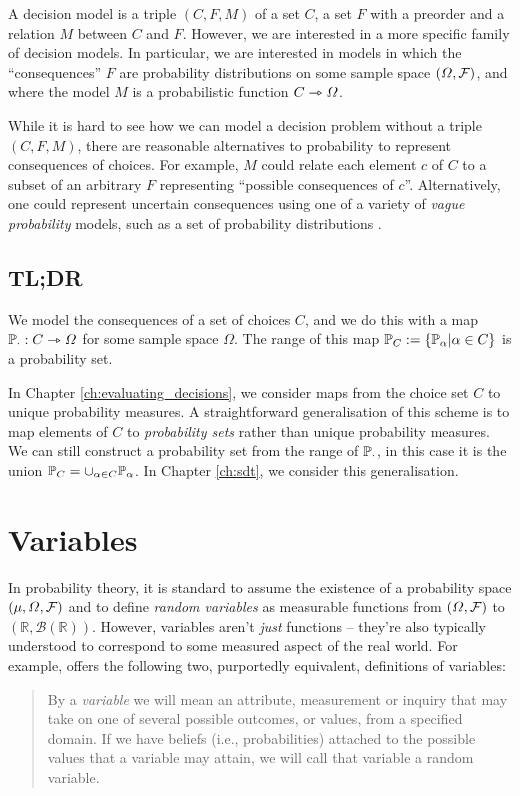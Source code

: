 A decision model is a triple $(C,F,M)$ of a set $C$, a set $F$ with a preorder and a relation $M$ between $C$ and $F$.  However, we are interested in a more specific family of decision models. In particular, we are interested in models in which the ``consequences'' $F$ are probability distributions on some sample space $(\Omega,\mathcal{F})$, and where the model $M$ is a probabilistic function $C\rightarrowtriangle \Omega$.

While it is hard to see how we can model a decision problem without a triple $(C,F,M)$, there are reasonable alternatives to probability to represent consequences of choices. For example, $M$ could relate each element $c$ of $C$ to a subset of an arbitrary $F$ representing ``possible consequences of $c$''. Alternatively, one could represent uncertain consequences using one of a variety of \emph{vague probability} models, such as a set of probability distributions \citep{walley_statistical_1991}. 

\subsection{TL;DR}\label{sec:probability_sets}

We model the consequences of a set of choices $C$, and we do this with a map $\mathbb{P}_\cdot:C\rightarrowtriangle \Omega$ for some sample space $\Omega$. The range of this map $\mathbb{P}_C:=\{\mathbb{P}_\alpha|\alpha\in C\}$ is a probability set.

In Chapter \ref{ch:evaluating_decisions}, we consider maps from the choice set $C$ to unique probability measures. A straightforward generalisation of this scheme is to map elements of $C$ to \emph{probability sets} rather than unique probability measures. We can still construct a probability set from the range of $\mathbb{P}_\cdot$, in this case it is the union $\mathbb{P}_C=\cup_{\alpha\in C} \mathbb{P}_\alpha$. In Chapter \ref{ch:sdt}, we consider this generalisation.


\section{Variables}\label{sec:variable}

In probability theory, it is standard to assume the existence of a probability space $(\mu,\Omega,\mathcal{F})$ and to define \emph{random variables} as measurable functions from $(\Omega,\mathcal{F})$ to $(\mathbb{R},\mathcal{B}(\mathbb{R}))$. However, variables aren't \emph{just} functions -- they're also typically understood to correspond to some measured aspect of the real world. For example, \citet{pearl_causality:_2009} offers the following two, purportedly equivalent, definitions of variables:
\begin{quote}
By a \emph{variable} we will mean an attribute, measurement or inquiry that may take on one of several possible outcomes, or values, from a specified domain. If we have beliefs (i.e., probabilities) attached to the possible values that a variable may attain, we will call that variable a random variable.
\end{quote}

